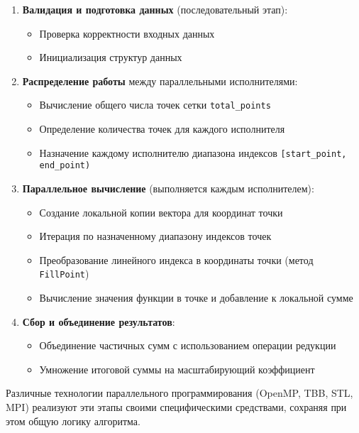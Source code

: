 \documentclass[a4paper,12pt]{article}
\begin{document}
  \begin{enumerate}
    \item \textbf{Валидация и подготовка данных} (последовательный этап):
    \begin{itemize}
      \item Проверка корректности входных данных
      \item Инициализация структур данных
    \end{itemize}

    \item \textbf{Распределение работы} между параллельными исполнителями:
    \begin{itemize}
      \item Вычисление общего числа точек сетки \texttt{total\_points}
      \item Определение количества точек для каждого исполнителя
      \item Назначение каждому исполнителю диапазона индексов \texttt{[start\_point, end\_point)}
    \end{itemize}

    \item \textbf{Параллельное вычисление} (выполняется каждым исполнителем):
    \begin{itemize}
      \item Создание локальной копии вектора для координат точки
      \item Итерация по назначенному диапазону индексов точек
      \item Преобразование линейного индекса в координаты точки (метод \texttt{FillPoint})
      \item Вычисление значения функции в точке и добавление к локальной сумме
    \end{itemize}

    \item \textbf{Сбор и объединение результатов}:
    \begin{itemize}
      \item Объединение частичных сумм с использованием операции редукции
      \item Умножение итоговой суммы на масштабирующий коэффициент
    \end{itemize}
  \end{enumerate}

  Различные технологии параллельного программирования (OpenMP, TBB, STL, MPI) реализуют эти этапы своими специфическими средствами, сохраняя при этом общую логику алгоритма.
\end{document}
